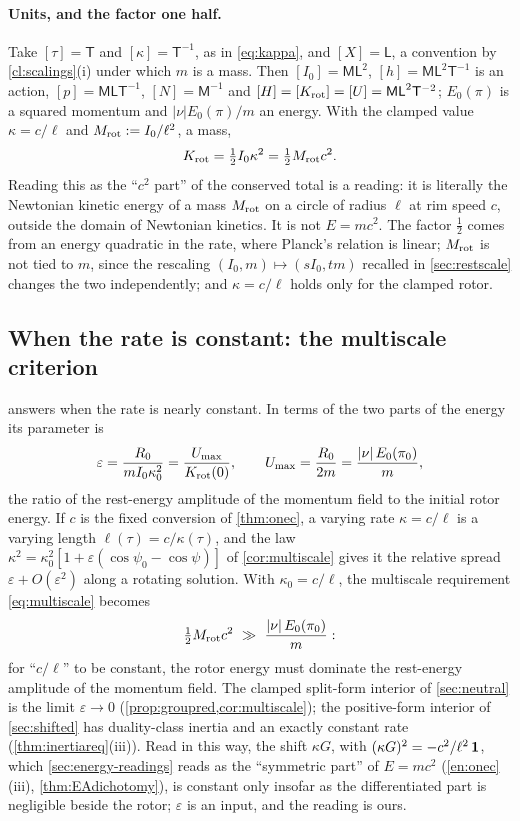 \paragraph{Units, and the factor one half.} Take $[\tau]=\mathsf T$ and $[\kappa]=\mathsf T^{-1}$, as in \eqref{eq:kappa}, and $[X]=\mathsf L$, a
convention by \cref{cl:scalings}(i) under which $m$ is a mass. Then $[I_0]=\mathsf{ML}^2$, $[h]=\mathsf{ML}^2\mathsf T^{-1}$ is an action,
$[p]=\mathsf{MLT}^{-1}$, $[N]=\mathsf M^{-1}$ and $[H]=[K_{\rm rot}]=[U]=\mathsf{ML}^2\mathsf T^{-2}$; $E_0(\pi)$ is a squared momentum and
$|\nu|E_0(\pi)/m$ an energy. With the clamped value $\kappa=c/\ell$ and $M_{\rm rot}:=I_0/\ell^2$, a mass,
\[
K_{\rm rot}=\tfrac12I_0\kappa^2=\tfrac12M_{\rm rot}c^2 .
\]
Reading this as the ``$c^2$ part'' of the conserved total is a reading: it is literally the Newtonian kinetic energy of a mass $M_{\rm rot}$ on a
circle of radius $\ell$ at rim speed $c$, outside the domain of Newtonian kinetics. It is not $E=mc^2$. The factor $\tfrac12$ comes from an energy
quadratic in the rate, where Planck's relation is linear; $M_{\rm rot}$ is not tied to $m$, since the rescaling $(I_0,m)\mapsto(sI_0,tm)$ recalled in \cref{sec:restscale} changes the two
independently; and $\kappa=c/\ell$ holds only
for the clamped rotor.

\subsection{When the rate is constant: the multiscale criterion}
\label{sec:restmultiscale}

 answers when the rate is nearly constant. In terms of the two parts of the energy its parameter is
\[
\varepsilon=\frac{R_0}{mI_0\kappa_0^2}=\frac{U_{\max}}{K_{\rm rot}(0)},\qquad U_{\max}=\frac{R_0}{2m}=\frac{|\nu|\,E_0(\pi_0)}m ,
\]
the ratio of the rest-energy amplitude of the momentum field to the initial rotor energy. If $c$ is the fixed conversion of \cref{thm:onec}, a
varying rate $\kappa=c/\ell$ is a varying length $\ell(\tau)=c/\kappa(\tau)$, and the law $\kappa^2=\kappa_0^2[1+\varepsilon(\cos\psi_0-\cos\psi)]$ of
\cref{cor:multiscale} gives it the relative spread $\varepsilon+O(\varepsilon^2)$ along a rotating solution. With $\kappa_0=c/\ell$, the multiscale
requirement \eqref{eq:multiscale} becomes
\[
\tfrac12M_{\rm rot}c^2\ \gg\ \frac{|\nu|\,E_0(\pi_0)}m :
\]
for ``$c/\ell$'' to be constant, the rotor energy must dominate the rest-energy amplitude of the momentum field. The clamped split-form interior
of \cref{sec:neutral} is the limit $\varepsilon\to0$ (\cref{prop:groupred,cor:multiscale}); the positive-form interior of \cref{sec:shifted} has
duality-class inertia and an exactly constant rate (\cref{thm:inertiareq}(iii)). Read in this way, the shift $\kappa G$, with $(\kappa G)^2=-c^2/\ell^2\,\mathbf 1$, which \cref{sec:energy-readings} reads as the ``symmetric part'' of $E=mc^2$
(\cref{en:onec}(iii), \cref{thm:EAdichotomy}), is constant only insofar as the differentiated part is negligible beside the rotor; $\varepsilon$ is an input, and the
reading is ours.

